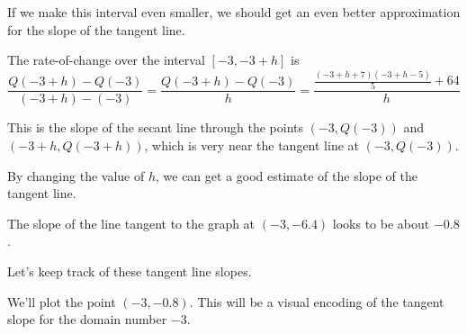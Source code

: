 \documentclass{ximera}
\begin{document}
If we make this interval even smaller, we should get an even better approximation for the slope of the tangent line.




The rate-of-change over the interval $[-3, -3+h]$ is 
\[  \frac{Q(-3+h)-Q(-3)}{(-3+h)-(-3)} = \frac{Q(-3+h)-Q(-3)}{h} =  \frac{\frac{(-3+h+7)(-3+h-5)}{5}+64}{h}   \]


This is the slope of the secant line through the points $(-3, Q(-3))$ and $(-3+h, Q(-3+h))$, which is very near the tangent line at $(-3, Q(-3))$.



By changing the value of $h$, we can get a good estimate of the slope of the tangent line.









\begin{center}
\end{center}




The slope of the line tangent to the graph at $(-3, -6.4)$ looks to be about $-0.8$.

Let's keep track of these tangent line slopes.

We'll plot the point $(-3,-0.8)$.  This will be a visual encoding of the tangent slope for the domain number $-3$.





\begin{image}
\end{image}
\end{document}
